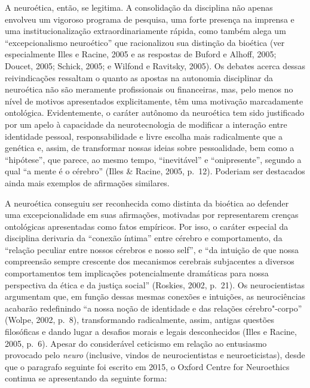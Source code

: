 A neuroética, então, se legitima. A consolidação da disciplina não
apenas envolveu um vigoroso programa de pesquisa, uma forte presença na
imprensa e uma institucionalização extraordinariamente rápida, como
também alega um ``excepcionalismo neuroético'' que racionalizou sua
distinção da bioética (ver especialmente Illes e Racine, 2005 e as
respostas de Buford e Alhoff, 2005; Doucet, 2005; Schick, 2005; e
Wilfond e Ravitsky, 2005). Os debates acerca dessas reivindicações
ressaltam o quanto as apostas na autonomia disciplinar da neuroética não
são meramente profissionais ou financeiras, mas, pelo menos no nível de
motivos apresentados explicitamente, têm uma motivação marcadamente
ontológica. Evidentemente, o caráter autônomo da neuroética tem sido
justificado por um apelo à capacidade da neurotecnologia de modificar a
interação entre identidade pessoal, responsabilidade e livre escolha
mais radicalmente que a genética e, assim, de transformar nossas ideias
sobre pessoalidade, bem como a ``hipótese'', que parece, ao mesmo tempo,
``inevitável'' e ``onipresente'', segundo a qual ``a mente é o cérebro''
(Illes \& Racine, 2005, p.~12). Poderiam ser destacados ainda mais
exemplos de afirmações similares.

A neuroética conseguiu ser reconhecida como distinta da bioética ao
defender uma excepcionalidade em suas afirmações, motivadas por
representarem crenças ontológicas apresentadas como fatos empíricos. Por
isso, o caráter especial da disciplina derivaria da ``conexão íntima''
entre cérebro e comportamento, da ``relação peculiar entre nossos
cérebros e nosso self'', e ``da intuição de que nossa compreensão sempre
crescente dos mecanismos cerebrais subjacentes a diversos comportamentos
tem implicações potencialmente dramáticas para nossa perspectiva da
ética e da justiça social'' (Roskies, 2002, p.~21). Os neurocientistas
argumentam que, em função dessas mesmas conexões e intuições, as
neurociências acabarão redefinindo ``a nossa noção de identidade e das
relações cérebro"-corpo'' (Wolpe, 2002, p.~8), transformando radicalmente,
assim, antigas questões filosóficas e dando lugar a desafios morais e
legais desconhecidos (Illes e Racine, 2005, p.~6). Apesar do considerável
ceticismo em relação ao entusiasmo provocado pelo \emph{neuro}
(inclusive, vindos de neurocientistas e neuroeticistas), desde que o
paragrafo seguinte foi escrito em 2015, o Oxford Centre for Neuroethics
continua se apresentando da seguinte forma:

